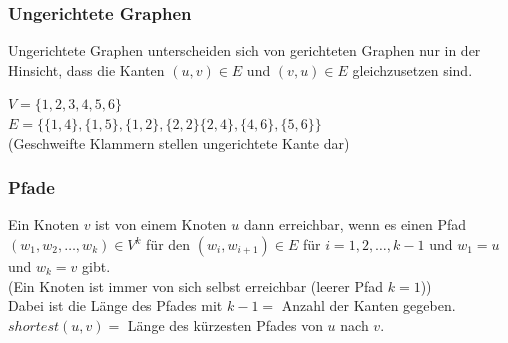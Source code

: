 \documentclass[
../AuD-Zusammenfassung.tex,
]
{subfiles}
\begin{document}
\subsubsection{Ungerichtete Graphen}
Ungerichtete Graphen unterscheiden sich von gerichteten Graphen nur in der Hinsicht, dass die Kanten $(u,v)\in E$ und $(v,u) \in E$ gleichzusetzen sind.\\
\begin{minipage}[t]{\textwidth}
    \centering
    $V = \{1,2,3,4,5,6\}$\\
    $E = \{\{1,4\},\{1,5\},\{1,2\},\{2,2\}\{2,4\},\{4,6\},\{5,6\}\}$\\
    (Geschweifte Klammern stellen ungerichtete Kante dar)
\end{minipage}
\subsubsection{Pfade}
Ein Knoten $v$ ist von einem Knoten $u$ dann erreichbar, wenn es einen Pfad $(w_1,w_2,\ldots,w_k) \in V^k$ für den $(w_i,w_{i+1}) \in E$ für $i = 1,2,\ldots,k - 1$ und $w_1 = u$ und $w_k = v$ gibt.\\
(Ein Knoten ist immer von sich selbst erreichbar (leerer Pfad $k = 1$))\\
Dabei ist die Länge des Pfades mit $k - 1 =$ Anzahl der Kanten gegeben. $shortest(u,v) =$ Länge des kürzesten Pfades von $u$ nach $v$. 
\newpage
\end{document}
